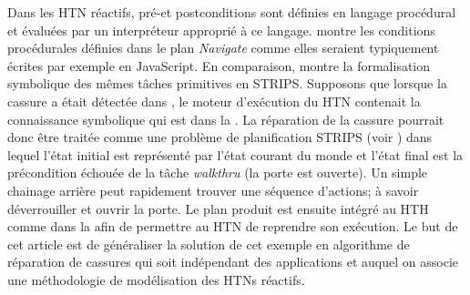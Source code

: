 \documentclass[a4paper,twoside,french]{article}
\begin{document}
	
		\par Dans les HTN réactifs, pré-et postconditions sont définies en langage  procédural et évaluées par un interpréteur approprié à ce langage.   montre les  conditions procédurales définies dans le plan {\em Navigate} comme elles seraient typiquement écrites par exemple en JavaScript. 
		 En comparaison,  montre la formalisation symbolique  des mêmes tâches primitives en STRIPS. 
		Supposons que lorsque la cassure a était détectée dans , le moteur d'exécution du HTN  contenait la connaissance symbolique qui est dans la  . La réparation de la cassure pourrait donc être traitée comme une problème de planification STRIPS (voir ) dans lequel l'état initial est représenté par l'état courant du monde et l'état final est la précondition échouée de la tâche {\em walkthru} (la porte est ouverte). Un simple chainage arrière peut rapidement trouver une séquence d'actions; à savoir déverrouiller et ouvrir la porte. Le plan produit est ensuite intégré au HTH  comme dans la  afin de permettre au HTN de reprendre son exécution.  Le but de cet article est de généraliser la solution de cet exemple en algorithme de réparation de cassures qui soit indépendant des applications et auquel on associe une méthodologie de modélisation des HTNs réactifs.
		
\end{document}

